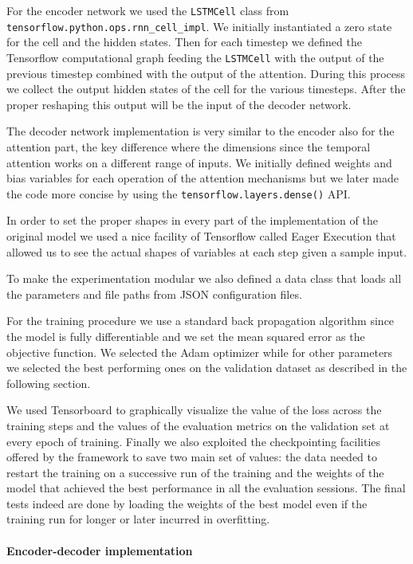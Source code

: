 \documentclass{article}
\begin{document}
For the encoder network we used the \texttt{LSTMCell} class from
\texttt{tensorflow.python.ops.rnn\_cell\_impl}.
We initially instantiated a zero state for the cell and the hidden states. Then
for each timestep we defined the
Tensorflow computational graph feeding the \texttt{LSTMCell} with the output of
the previous timestep combined with the
output of the attention. During this process we collect the output hidden
states of the cell for the various timesteps.
After the proper reshaping this output will be the input of the decoder network.

The decoder network implementation is very similar to the encoder also for the
attention part, the key difference where
the dimensions since the temporal attention works on a different range of
inputs. We initially defined weights and bias
variables for each operation of the attention mechanisms but we later made the
code more concise by using the
\texttt{tensorflow.layers.dense()} API.

In order to set the proper shapes in every part of the implementation of the
original model we used a nice facility of
Tensorflow called Eager Execution that allowed us to see the actual shapes of
variables at each step given a sample
input.

To make the experimentation modular we also defined a data class that loads all
the parameters and file paths from
JSON configuration files.

For the training procedure we use a standard back propagation algorithm since
the model is fully differentiable and we
set the mean squared error as the objective function. We selected the Adam
optimizer while for other parameters we
selected the best performing ones on the validation dataset as described in the
following section.

We used Tensorboard to graphically visualize the value of the loss across 
the training steps and the values of the evaluation metrics on the validation set 
at every epoch of training. Finally we also exploited the checkpointing facilities
offered by the framework to save two main set of values: the data needed to 
restart the training on a successive run of the training and the weights of the 
model that achieved the best performance in all the evaluation sessions. The final
tests indeed are done by loading the weights of the best model even if the 
training run for longer or later incurred in overfitting.

\paragraph{Encoder-decoder implementation}
\end{document}
